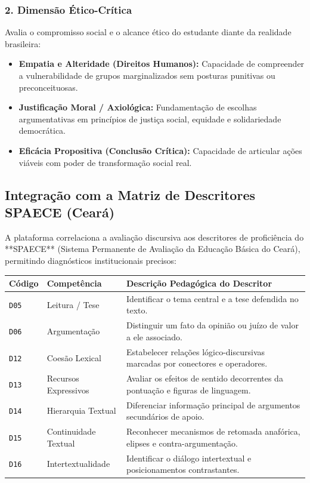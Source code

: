 \documentclass[11pt,a4paper]{article}
\begin{document}
\subsubsection{2. Dimensão Ético-Crítica}
Avalia o compromisso social e o alcance ético do estudante diante da realidade brasileira:
\begin{itemize}[leftmargin=1.5em]
    \item \textbf{Empatia e Alteridade (Direitos Humanos):} Capacidade de compreender a vulnerabilidade de grupos marginalizados sem posturas punitivas ou preconceituosas.
    \item \textbf{Justificação Moral / Axiológica:} Fundamentação de escolhas argumentativas em princípios de justiça social, equidade e solidariedade democrática.
    \item \textbf{Eficácia Propositiva (Conclusão Crítica):} Capacidade de articular ações viáveis com poder de transformação social real.
\end{itemize}

\subsection{Integração com a Matriz de Descritores SPAECE (Ceará)}
A plataforma correlaciona a avaliação discursiva aos descritores de proficiência do **SPAECE** (Sistema Permanente de Avaliação da Educação Básica do Ceará), permitindo diagnósticos institucionais precisos:

\begin{center}
\begin{tabularx}{\textwidth}{l l p{8.5cm}}
\toprule
\textbf{Código} & \textbf{Competência} & \textbf{Descrição Pedagógica do Descritor} \\
\midrule
\texttt{D05} & Leitura / Tese & Identificar o tema central e a tese defendida no texto. \\
\texttt{D06} & Argumentação & Distinguir um fato da opinião ou juízo de valor a ele associado. \\
\texttt{D12} & Coesão Lexical & Estabelecer relações lógico-discursivas marcadas por conectores e operadores. \\
\texttt{D13} & Recursos Expressivos & Avaliar os efeitos de sentido decorrentes da pontuação e figuras de linguagem. \\
\texttt{D14} & Hierarquia Textual & Diferenciar informação principal de argumentos secundários de apoio. \\
\texttt{D15} & Continuidade Textual & Reconhecer mecanismos de retomada anafórica, elipses e contra-argumentação. \\
\texttt{D16} & Intertextualidade & Identificar o diálogo intertextual e posicionamentos contrastantes. \\
\bottomrule
\end{tabularx}
\end{center}
\end{document}
